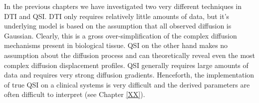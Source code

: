 %

In the previous chapters we have investigated two very different techniques in DTI and QSI. DTI only requires relatively little amounts of data, but it's underlying model is based on the assumption that all observed diffusion is Gaussian. Clearly, this is a gross over-simplification of the complex diffusion mechanisms present in biological tissue. QSI on the other hand makes no assumption about the diffusion process and can theoretically reveal even the most complex diffusion displacement profiles. QSI generally requires large amounts of data and requires very strong diffusion gradients. Henceforth, the implementation of true QSI on a clinical systems is very difficult and the derived parameters are often difficult to interpret (see Chapter \ref{XX}).
